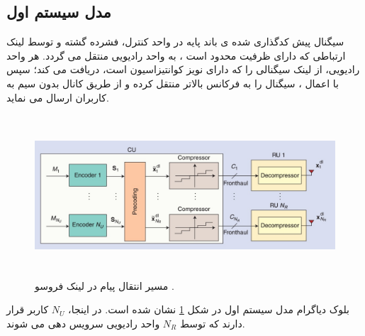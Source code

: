 \subsection{مدل سیستم اول}
سیگنال پیش کدگذاری شده ی باند پایه در واحد کنترل، فشرده گشته و توسط لینک ارتباطی  که دارای ظرفیت محدود است \cite{fc2}، به واحد رادیویی منتقل می گردد.
هر واحد رادیویی، از لینک  سیگنالی را که دارای نویز کوانتیزاسیون است، دریافت می کند؛ سپس با اعمال ، سیگنال را به فرکانس بالاتر منتقل کرده و از طریق کانال بدون سیم به کاربران ارسال می نماید.
\begin{figure}[H]
  \centering
    \includegraphics[width=\linewidth, height=6cm]{./fig/dl}
  \caption{مسیر انتقال پیام در لینک فروسو \cite{Fronthaul}.}
  \label{fig:dl}
\end{figure}
بلوک دیاگرام مدل سیستم اول
در شکل \ref{fig:dl} نشان شده است. 
در اینجا، $N_U$ کاربر قرار دارند که توسط $N_R$ واحد رادیویی سرویس دهی می شوند.


